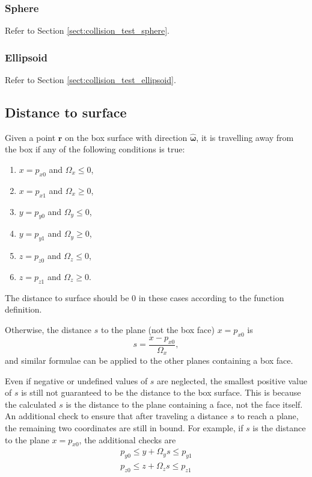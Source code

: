 \subsubsection{Sphere}
Refer to Section \ref{sect:collision_test_sphere}.
\subsubsection{Ellipsoid}
Refer to Section \ref{sect:collision_test_ellipsoid}.

\subsection{Distance to surface}
Given a point $\bm{r}$ on the box surface with direction $\bm{\hat{\omega}}$, it is travelling away from the box if any of the following conditions is true:
\begin{enumerate}
    \item $x = p_{x0}$ and $\Omega_x \leq 0$,
    \item $x = p_{x1}$ and $\Omega_x \geq 0$,
    \item $y = p_{y0}$ and $\Omega_y \leq 0$,
    \item $y = p_{y1}$ and $\Omega_y \geq 0$,
    \item $z = p_{z0}$ and $\Omega_z \leq 0$,
    \item $z = p_{z1}$ and $\Omega_z \geq 0$.
\end{enumerate}
The distance to surface should be 0 in these cases according to the function definition.

Otherwise, the distance $s$ to the plane (not the box face) $x = p_{x0}$ is
\begin{equation}
    s = \frac{x - p_{x0}}{\Omega_x},
\end{equation}
and similar formulae can be applied to the other planes containing a box face.

Even if negative or undefined values of $s$ are neglected, the smallest positive value of $s$ is still not guaranteed to be the distance to the box surface.
This is because the calculated $s$ is the distance to the plane containing a face, not the face itself. An additional check to ensure that after traveling a
distance $s$ to reach a plane, the remaining two coordinates are still in bound. For example, if $s$ is the distance to the plane $x = p_{x0}$, the additional
checks are
\begin{align}
    p_{y0} \leq y + \Omega_y s \leq p_{y1} \\
    p_{z0} \leq z + \Omega_z s \leq p_{z1}
\end{align}

